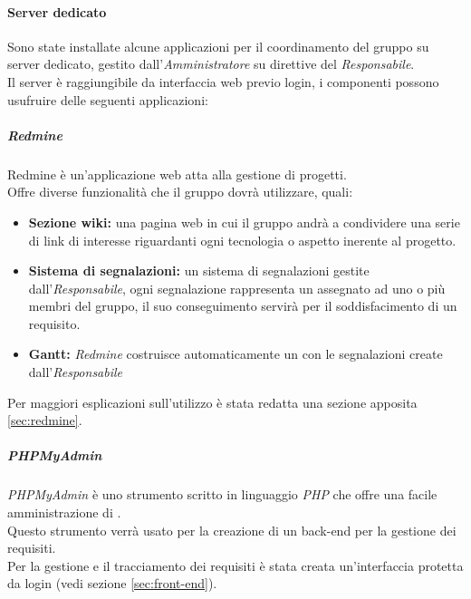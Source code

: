 \documentclass{scalatekids-article}
\begin{document}
\paragraph{Server dedicato}
\label{sec:server}
Sono state installate alcune applicazioni per il coordinamento del gruppo su
server dedicato, gestito dall'\textit{Amministratore} su direttive del
\textit{Responsabile}.\\ Il server è raggiungibile da interfaccia web previo
login, i componenti possono usufruire delle seguenti applicazioni:

\subparagraph{Redmine}
Redmine è un'applicazione web atta alla gestione di progetti.\\
Offre diverse funzionalità che il gruppo dovrà utilizzare, quali:
\begin{itemize}
\item\textbf{Sezione wiki:} una pagina web in cui il gruppo andrà a condividere una serie di link di interesse riguardanti ogni tecnologia o aspetto inerente al progetto.
\item\textbf{Sistema di segnalazioni:} un sistema di segnalazioni gestite dall'\textit{Responsabile}, ogni segnalazione rappresenta un  assegnato ad uno o più membri del gruppo, il suo conseguimento servirà per il soddisfacimento di un requisito.
\item\textbf{Gantt:} \textit{Redmine} costruisce automaticamente un  con le segnalazioni create dall'\textit{Responsabile}
\end{itemize}
Per maggiori esplicazioni sull'utilizzo è stata redatta una sezione apposita \ref{sec:redmine}.

\subparagraph{PHPMyAdmin}
\textit{PHPMyAdmin} è uno strumento scritto in linguaggio \textit{PHP} che offre una facile amministrazione di \textit{}.\\
Questo strumento verrà usato per la creazione di un back-end per la gestione dei requisiti.\\
Per la gestione e il tracciamento dei requisiti è stata creata un'interfaccia protetta da login (vedi sezione \ref{sec:front-end}).
\end{document}
